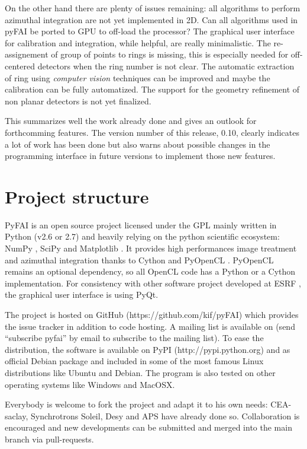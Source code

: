 \documentclass[preprint]{iucr}
\begin{document}
On the other hand there are plenty of issues remaining: all algorithms to
perform azimuthal integration are not yet implemented in 2D. 
Can all algorithms used in
pyFAI be ported to GPU to off-load the processor? The graphical user interface
for calibration and integration, while helpful, are really minimalistic.
The re-assignement of group of points to rings is missing, this is
especially needed for off-centered detectors when the ring number is not clear.
The automatic extraction of ring using \textit{computer vision} techniques can
be improved and maybe the calibration can be fully automatized.
The support for the geometry refinement of non planar detectors is not yet
finalized.

This summarizes well the work already done and gives an
outlook for forthcomming features.
The version number of this release, 0.10, clearly indicates a lot of work has
been done but also warns about possible changes in the programming interface
in future versions to implement those new features.




\appendix
\section{Project structure}

PyFAI is an open source project licensed under the GPL mainly written in Python (v2.6 or 2.7)
and heavily relying on the python scientific ecosystem: NumPy \cite{numpy},
SciPy \cite{scipy} and Matplotlib \cite{matplotlib}.
It provides high performances image treatment and azimuthal integration thanks
to Cython \cite{cython} and PyOpenCL \cite{pyopencl}.
PyOpenCL remains an optional dependency, so all OpenCL code has a
Python or a Cython implementation.
For consistency with other software project developed at ESRF \cite{pymca},
the graphical user interface is using PyQt.

The project is hosted on GitHub (https://github.com/kif/pyFAI) which provides
the issue tracker in addition to code hosting. A mailing list is available on
 (send ``subscribe pyfai'' by email to subscribe to the
mailing list).
To ease the distribution, the software is available on PyPI
(http://pypi.python.org) and as official Debian package and included in some of
the most famous Linux distributions like Ubuntu and Debian.
The program is also tested on other operating systems like Windows and
MacOSX.

Everybody is welcome to fork the project and adapt it to his own needs:
CEA-saclay,  Synchrotrons Soleil, Desy and APS have already done so.
Collaboration is encouraged and new developments can be submitted and merged into the main branch
via pull-requests.
\end{document}
